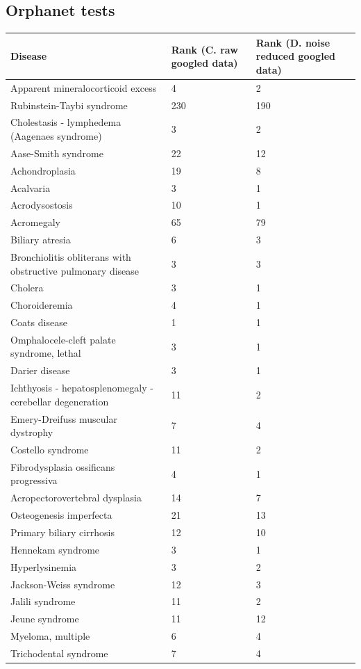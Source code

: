 \documentclass[10pt,letterpaper,two column,final]{article}
\begin{document}
\subsection{Orphanet tests}
\label{app:orphanet_raw_reduced}
\begin{center}
\begin{small}
	\begin{longtable}{|p{6cm}|p{2.5cm}|p{2.5cm}|}
	\hline
	\textbf{Disease}  & \textbf{Rank (C. raw googled data)} & \textbf{Rank (D. noise reduced googled data)} \\
    \hline\hline
    Apparent mineralocorticoid excess & 4 & 2\\    \hline
    Rubinstein-Taybi syndrome  & 230 & 190\\    \hline
    Cholestasis - lymphedema  (Aagenaes syndrome) & 3 & 2\\    \hline
    Aase-Smith syndrome  & 22 & 12\\    \hline
    Achondroplasia  & 19 & 8\\    \hline
    Acalvaria    & 3 & 1\\    \hline
    Acrodysostosis  & 10 & 1\\    \hline
    Acromegaly & 65 & 79\\    \hline
    Biliary atresia  & 6 & 3\\    \hline
    Bronchiolitis obliterans with obstructive pulmonary disease  & 3 & 3\\    \hline
    Cholera  & 3 & 1\\    \hline
    Choroideremia  & 4 & 1\\    \hline
    Coats disease  & 1 & 1\\    \hline
    Omphalocele-cleft palate syndrome, lethal  & 3 & 1\\    \hline
    Darier disease  & 3 & 1\\    \hline
    Ichthyosis - hepatosplenomegaly - cerebellar degeneration  & 11 & 2\\    \hline
    Emery-Dreifuss muscular dystrophy  & 7 & 4\\    \hline
    Costello syndrome  & 11 & 2\\    \hline
    Fibrodysplasia ossificans progressiva  & 4 & 1\\    \hline
    Acropectorovertebral dysplasia  & 14 & 7\\    \hline
    Osteogenesis imperfecta  & 21 & 13\\    \hline
    Primary biliary cirrhosis  & 12 & 10\\    \hline
    Hennekam syndrome  & 3 & 1\\    \hline
    Hyperlysinemia  & 3 & 2\\    \hline
    Jackson-Weiss syndrome  & 12 & 3\\    \hline
    Jalili syndrome & 11 & 2\\    \hline
    Jeune syndrome & 11 & 12\\    \hline
    Myeloma, multiple  & 6 & 4\\    \hline
    Trichodental syndrome  & 7 & 4\\    \hline
    \end{longtable}
\end{small}
\end{center}
\end{document}
